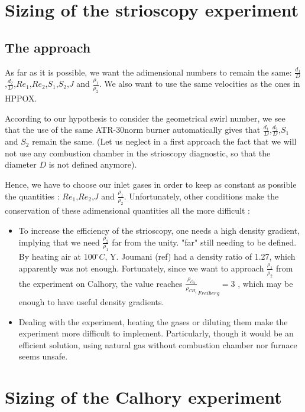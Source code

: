 \section{Sizing of the strioscopy experiment}
\subsection{The approach}
As far as it is possible, we want the adimensional numbers to remain the same: $\frac{d_{1}}{D}$,$\frac{d_{2}}{D}$,$Re_{1}$,$Re_{2}$,$S_{1}$,$S_{2}$,$J$ and $\frac{\rho_{1}}{\rho_{2}}$. We also want to use the same velocities as the ones in HPPOX. 

According to our hypothesis to consider the geometrical swirl number, we see that the use of the same ATR-30norm burner automatically gives that $\frac{d_{1}}{D}$,$\frac{d_{2}}{D}$,$S_{1}$ and $S_{2}$ remain the same. (Let us neglect in a first approach the fact that we will not use any combustion chamber in the strioscopy diagnostic, so that the diameter $D$ is not defined anymore). 

Hence, we have to choose our inlet gases in order to keep as constant as possible the quantities : $Re_{1}$,$Re_{2}$,$J$ and $\frac{\rho_{1}}{\rho_{2}}$. Unfortunately, other conditions make the conservation of these adimensional quantities all the more difficult :
\begin{itemize}
\item To increase the efficiency of the strioscopy, one needs a high density gradient, implying that we need   $\frac{\rho_{2}}{\rho_{1}}$ far from the unity. "far" still needing to be defined. By heating air at $100^\circ C$, Y. Joumani (ref) had a density ratio of 1.27, which apparently was not enough. Fortunately, since we want to approach $\frac{\rho_{1}}{\rho_{2}}$ from the experiment on Calhory, the value reaches $\frac{\rho_{O_{2}}}{\rho_{CH_{4}}}_{Freiberg}=3$ , which may be enough to have useful density gradients.
\item Dealing with the experiment, heating the gases or diluting them make the experiment more difficult to implement. Particularly, though it would be an efficient solution, using natural gas without combustion chamber nor furnace seems unsafe.
\end{itemize}

\section{Sizing of the Calhory experiment}

